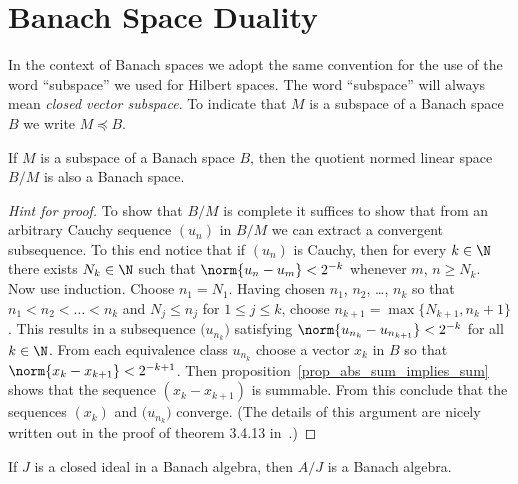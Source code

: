 \section{Banach Space Duality}

\begin{conv}\label{conv_subsp_Bsp} In the context of Banach spaces we adopt the same convention for the use of the word
``subspace'' we used for Hilbert spaces.  The word ``subspace'' will always mean
\emph{closed vector subspace}.  To indicate that $M$ is a subspace of a Banach space $B$ we write
$M \preccurlyeq B$.
\end{conv}

\begin{prop} If $M$ is a subspace of a Banach space $B$,
then the quotient normed linear space $B/M$ is also a Banach space.
\end{prop}

\begin{proof}[\emph{Hint for proof}] To show that $B/M$ is complete it suffices to show that from an
arbitrary Cauchy sequence $(u_n)$ in $B/M$ we can extract a convergent subsequence.  To this end
notice that if $(u_n)$ is Cauchy, then for every $k \in \N$ there exists $N_k \in \N$ such that
$\norm{u_n - u_m} < 2^{-k}$ whenever $m$, $n \ge N_k$.  Now use induction. Choose $n_1 = N_1$.
Having chosen $n_1$, $n_2$, \dots , $n_k$ so that $n_1 < n_2 < \dots < n_k$ and $N_j \le n_j$ for
$1 \le j \le k$, choose $n_{k+1} = \max\{N_{k+1}, n_k + 1\}$.  This results in a subsequence
$\bigl(u_{n_k}\bigr)$ satisfying $\norm{u_{n_k} - u_{n_{k+1}}} < 2^{-k}$ for all $k \in \N$.
From each equivalence class $u_{n_k}$ choose a vector $x_k$ in $B$ so that $\norm{x_k - x_{k+1}} < 2^{-k+1}$.
Then proposition~\ref{prop_abs_sum_implies_sum} shows that the sequence $(x_k - x_{k+1})$ is
summable.  From this conclude that the sequences $(x_k)$ and $\bigl(u_{n_k}\bigr)$ converge.
(The details of this argument are nicely written out in the proof of theorem 3.4.13 in~\cite{BrownP:1970}.) \ns
\end{proof}

\begin{prop} If $J$ is a closed ideal in a Banach algebra,
then $A/J$ is a Banach algebra.
\end{prop}

